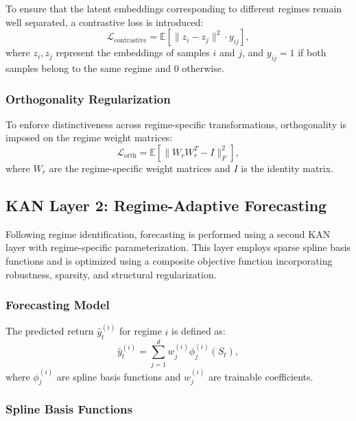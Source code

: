 \documentclass[conference,10pt]{IEEEtran}
\begin{document}
To ensure that the latent embeddings corresponding to different regimes remain well separated, a contrastive loss is introduced:
\begin{equation}
\mathcal{L}_{\text{contrastive}} = \mathbb{E} \left[ \| z_i - z_j \|^2 \cdot y_{ij} \right],
\end{equation}
where $z_i, z_j$ represent the embeddings of samples $i$ and $j$, and $y_{ij} = 1$ if both samples belong to the same regime and $0$ otherwise.

\subsubsection{Orthogonality Regularization}

To enforce distinctiveness across regime-specific transformations, orthogonality is imposed on the regime weight matrices:
\begin{equation}
\mathcal{L}_{\text{orth}} = \mathbb{E} \left[ \| W_r W_r^T - I \|_F^2 \right],
\end{equation}
where $W_r$ are the regime-specific weight matrices and $I$ is the identity matrix.

\subsection{KAN Layer 2: Regime-Adaptive Forecasting}

Following regime identification, forecasting is performed using a second KAN layer with regime-specific parameterization. This layer employs sparse spline basis functions and is optimized using a composite objective function incorporating robustness, sparsity, and structural regularization.

\subsubsection{Forecasting Model}

The predicted return $\hat{y}_t^{(i)}$ for regime $i$ is defined as:
\begin{equation}
\hat{y}_t^{(i)} = \sum_{j=1}^d w_j^{(i)} \phi_j^{(i)}(S_t),
\end{equation}
where $\phi_j^{(i)}$ are spline basis functions and $w_j^{(i)}$ are trainable coefficients.

\subsubsection{Spline Basis Functions}
\end{document}
